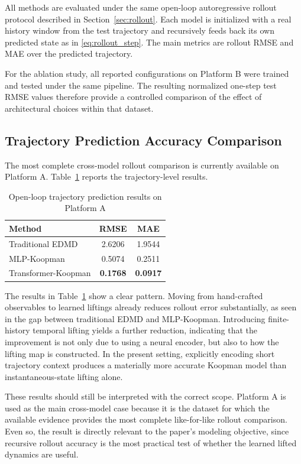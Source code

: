 \documentclass[journal]{IEEEtran}
\begin{document}
All methods are evaluated under the same open-loop autoregressive rollout protocol described in Section~\ref{sec:rollout}. Each model is initialized with a real history window from the test trajectory and recursively feeds back its own predicted state as in \eqref{eq:rollout_step}. The main metrics are rollout RMSE and MAE over the predicted trajectory.

For the ablation study, all reported configurations on Platform B were trained and tested under the same pipeline. The resulting normalized one-step test RMSE values therefore provide a controlled comparison of the effect of architectural choices within that dataset.

\subsection{Trajectory Prediction Accuracy Comparison}

The most complete cross-model rollout comparison is currently available on Platform A. Table~\ref{tab:prediction_platform_a} reports the trajectory-level results.

\begin{table}[!t]
\renewcommand{\arraystretch}{1.2}
\caption{Open-loop trajectory prediction results on Platform A}
\label{tab:prediction_platform_a}
\centering
\begin{tabular}{lcc}
\hline\hline
Method & RMSE & MAE \\
\hline
Traditional EDMD & 2.6206 & 1.9544 \\
MLP-Koopman & 0.5074 & 0.2511 \\
Transformer-Koopman & \textbf{0.1768} & \textbf{0.0917} \\
\hline\hline
\end{tabular}
\end{table}

The results in Table~\ref{tab:prediction_platform_a} show a clear pattern. Moving from hand-crafted observables to learned liftings already reduces rollout error substantially, as seen in the gap between traditional EDMD and MLP-Koopman. Introducing finite-history temporal lifting yields a further reduction, indicating that the improvement is not only due to using a neural encoder, but also to how the lifting map is constructed. In the present setting, explicitly encoding short trajectory context produces a materially more accurate Koopman model than instantaneous-state lifting alone.

These results should still be interpreted with the correct scope. Platform A is used as the main cross-model case because it is the dataset for which the available evidence provides the most complete like-for-like rollout comparison. Even so, the result is directly relevant to the paper's modeling objective, since recursive rollout accuracy is the most practical test of whether the learned lifted dynamics are useful.
\end{document}
